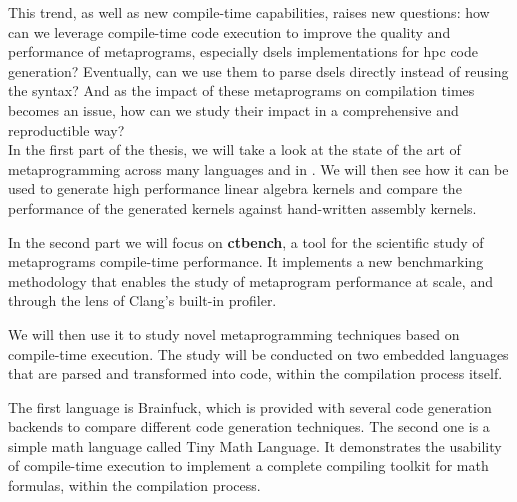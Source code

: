 \documentclass[main]{subfiles}
\begin{document}

This trend, as well as new \cpp compile-time capabilities, raises new questions:
how can we leverage compile-time \cpp code execution to improve the quality
and performance of \cpp metaprograms, especially \glspl{dsel} implementations
for \acrlong{hpc} code generation? Eventually, can we use them to parse
\glspl{dsel} directly instead of reusing the \cpp syntax?
And as the impact of these metaprograms on compilation times becomes an issue,
how can we study their impact in a comprehensive and reproductible way?
\\

In the first part of the thesis, we will take a look at the state of the art of
metaprogramming across many languages and in \cpp.
We will then see how it can be used to generate high performance linear algebra
kernels and compare the performance of the generated kernels against
hand-written assembly kernels.

In the second part we will focus on \textbf{ctbench}, a tool for the scientific
study of \cpp metaprograms compile-time performance. It implements a new
benchmarking methodology that enables the study of metaprogram performance
at scale, and through the lens of Clang's built-in profiler.

We will then use it to study novel \cpp metaprogramming techniques based on
compile-time \cpp execution. The study will be conducted on two embedded
languages that are parsed and transformed into \cpp code, within the \cpp
compilation process itself.

The first language is Brainfuck, which is provided with several code generation
backends to compare different code generation techniques. The second one
is a simple math language called Tiny Math Language. It demonstrates
the usability of compile-time \cpp execution to implement a complete compiling
toolkit for math formulas, within the \cpp compilation process.
\end{document}
